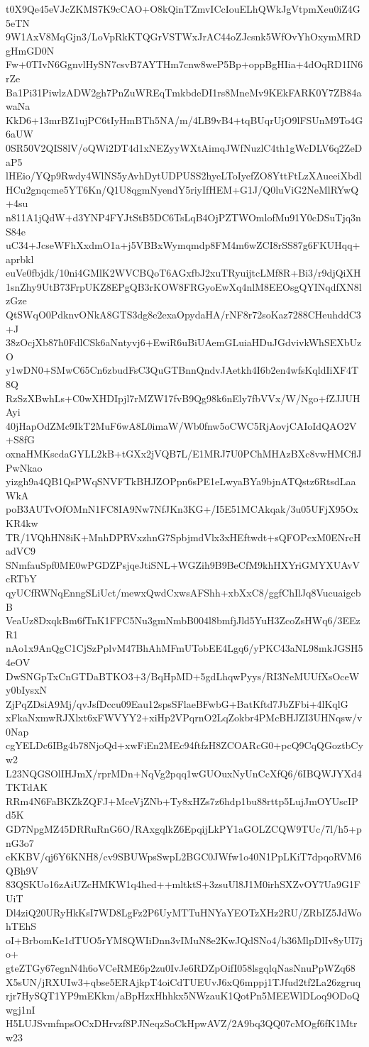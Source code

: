 t0X9Qe45eVJcZKMS7K9cCAO+O8kQinTZmvICcIouELhQWkJgVtpmXeu0iZ4G5eTN
9W1AxV8MqGjn3/LoVpRkKTQGrVSTWxJrAC44oZJcsnk5WfOvYhOxymMRDgHmGD0N
Fw+0TIvN6GgnvlHySN7csvB7AYTHm7cnw8weP5Bp+oppBgHIia+4dOqRD1IN6rZe
Ba1Pi31PiwlzADW2gh7PnZuWREqTmkbdeDI1rs8MneMv9KEkFARK0Y7ZB84awaNa
KkD6+13mrBZ1ujPC6tIyHmBTh5NA/m/4LB9vB4+tqBUqrUjO9lFSUnM9To4G6aUW
0SR50V2QIS8lV/oQWi2DT4d1xNEZyyWXtAimqJWfNuzlC4th1gWcDLV6q2ZeDaP5
lHEio/YQp9Rwdy4WlNS5yAvhDytUDPUSS2hyeLToIyefZO8YttFtLzXAueeiXbdl
HCu2gnqcme5YT6Kn/Q1U8qgmNyendY5riyIfHEM+G1J/Q0luViG2NeMlRYwQ+4su
n811A1jQdW+d3YNP4FYJtStB5DC6TsLqB4OjPZTWOmlofMu91Y0cDSuTjq3nS84e
uC34+JcseWFhXxdmO1a+j5VBBxWymqmdp8FM4m6wZCI8rSS87g6FKUHqq+aprbkl
euVe0fbjdk/10ni4GMlK2WVCBQoT6AGxfbJ2xuTRyuijtcLMf8R+Bi3/r9djQiXH
1snZhy9UtB73FrpUKZ8EPgQB3rKOW8FRGyoEwXq4nlM8EEOsgQYINqdfXN8lzGze
QtSWqO0PdknvONkA8GTS3dg8e2exaOpydaHA/rNF8r72soKaz7288CHeuhddC3+J
38zOcjXb87h0FdlCSk6aNntyvj6+EwiR6uBiUAemGLuiaHDuJGdvivkWhSEXbUzO
y1wDN0+SMwC65Cn6zbudFsC3QuGTBnnQndvJAetkh4I6b2en4wfsKqldIiXF4T8Q
RzSzXBwhLs+C0wXHDIpjl7rMZW17fvB9Qg98k6nEly7fbVVx/W/Ngo+fZJJUHAyi
40jHapOdZMc9IkT2MuF6wA8L0imaW/Wb0fnw5oCWC5RjAovjCAIoIdQAO2V+S8fG
oxnaHMKscdaGYLL2kB+tGXx2jVQB7L/E1MRJ7U0PChMHAzBXc8vwHMCflJPwNkao
yizgh9a4QB1QsPWqSNVFTkBHJZOPpn6sPE1eLwyaBYa9bjnATQstz6RtsdLaaWkA
poB3AUTvOfOMnN1FC8IA9Nw7NfJKn3KG+/I5E51MCAkqak/3u05UFjX95OxKR4kw
TR/1VQhHN8iK+MnhDPRVxzhnG7SpbjmdVlx3xHEftwdt+sQFOPcxM0ENrcHadVC9
SNmfauSpf0ME0wPGDZPsjqeJtiSNL+WGZih9B9BeCfM9khHXYriGMYXUAvVcRTbY
qyUCfRWNqEnngSLiUct/mewxQwdCxwsAFShh+xbXxC8/ggfChIlJq8VucuaigcbB
VeaUz8DxqkBm6fTnK1FFC5Nu3gmNmbB004l8bmfjJld5YuH3ZcoZsHWq6/3EEzR1
nAo1x9AnQgC1CjSzPplvM47BhAhMFmUTobEE4Lgq6/yPKC43aNL98mkJGSH54eOV
DwSNGpTxCnGTDaBTKO3+3/BqHpMD+5gdLhqwPyys/RI3NeMUUfXsOceWy0bIysxN
ZjPqZDsiA9Mj/qvJsfDccu09Eau12spsSFlaeBFwbG+BatKftd7JbZFbi+4lKqlG
xFkaNxmwRJXlxt6xFWVYY2+xiHp2VPqrnO2LqZokbr4PMcBHJZI3UHNqsw/v0Nap
cgYELDc6IBg4b78NjoQd+xwFiEn2MEc94ftfzH8ZCOARcG0+pcQ9CqQGoztbCyw2
L23NQGSOlIHJmX/rprMDn+NqVg2pqq1wGUOuxNyUnCcXfQ6/6IBQWJYXd4TKTdAK
RRm4N6FaBKZkZQFJ+MceVjZNb+Ty8xHZs7z6hdp1bu88rttp5LujJmOYUscIPd5K
GD7NpgMZ45DRRuRnG6O/RAxgqlkZ6EpqijLkPY1aGOLZCQW9TUc/7l/h5+pnG3o7
eKKBV/qj6Y6KNH8/cv9SBUWpsSwpL2BGC0JWfw1o40N1PpLKiT7dpqoRVM6QBh9V
83QSKUo16zAiUZcHMKW1q4hed++mltktS+3zsuUl8J1M0irhSXZvOY7Ua9G1FUiT
Dl4ziQ20URyHkKsI7WD8LgFz2P6UyMTTuHNYaYEOTzXHz2RU/ZRbIZ5JdWohTEhS
oI+BrbomKe1dTUO5rYM8QWIiDnn3vIMuN8e2KwJQdSNo4/b36MlpDlIv8yUI7jo+
gteZTGy67egnN4h6oVCeRME6p2zu0IvJe6RDZpOifI058lsgqlqNasNnuPpWZq68
X5sUN/jRXUIw3+qbse5ERAjkpT4oiCdTUEUvJ6xQ6mppj1TJfud2tf2La26zgruq
rjr7HySQT1YP9mEKkm/aBpHzxHhhkx5NWzauK1QotPn5MEEWlDLoq9ODoQwgj1nI
H5LUJSvmfnpsOCxDHrvzf8PJNeqzSoCkHpwAVZ/2A9bq3QQ07cMOgf6fK1Mtrw23
